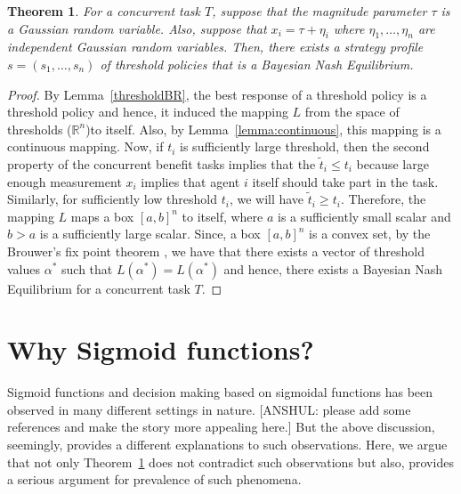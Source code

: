 \documentclass[conference]{ieeeconf}
\newtheorem{theorem}{Theorem}
\def\R{\mathbb{R}}
\begin{document}
\begin{theorem}\label{thrm:mainthrm}
For a concurrent task $T$, suppose that the magnitude parameter $\tau$ is a Gaussian random variable. Also, suppose that $x_i=\tau+\eta_i$ where $\eta_1,\ldots,\eta_n$ are independent Gaussian random variables. Then, there exists a strategy profile $s=(s_1,\ldots,s_n)$ of threshold policies that is a Bayesian Nash Equilibrium.
\end{theorem}
\begin{proof}
By Lemma~\ref{thresholdBR}, the best response of a threshold policy is a threshold policy and hence, it induced the mapping $L$ from the space of thresholds ($\R^n$)to itself. Also, by Lemma~\ref{lemma:continuous}, this mapping is a continuous mapping. Now, if $t_i$ is sufficiently large threshold, then the second property of the concurrent benefit tasks implies that the $\tilde{t}_i\leq t_i$ because large enough measurement $x_i$ implies that agent $i$ itself should take part in the task. Similarly, for sufficiently low threshold $t_i$, we will have $\tilde{t}_i\geq t_i$. Therefore, the mapping $L$ maps a box $[a,b]^n$ to itself, where $a$ is a sufficiently small scalar and $b>a$ is a sufficiently large scalar. Since, a box $[a,b]^n$ is a convex set, by the Brouwer's fix point theorem \cite{border1990fixed}, we have that there exists a vector of threshold values $\alpha^*$ such that $L(\alpha^*)=L(\alpha^*)$ and hence, there exists a Bayesian Nash Equilibrium for a concurrent task $T$.
\end{proof}

\section{Why Sigmoid functions?}
Sigmoid functions and decision making based on sigmoidal functions has been observed in many different settings in nature. [ANSHUL: please add some references and make the story more appealing here.] But the above discussion, seemingly, provides a different explanations to such observations. Here, we argue that not only Theorem~\ref{thrm:mainthrm} does not contradict such observations but also, provides a serious argument for prevalence of such phenomena. 
\end{document}
